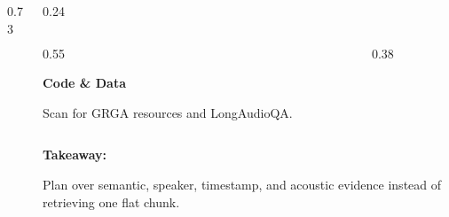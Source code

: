 \documentclass[final]{beamer}
\newlength{\contentWidth}
\newcommand{\smallText}{\fontsize{16.5}{20}\selectfont}
\newenvironment{postercontent}{%
  \par\noindent\hspace*{\dimexpr(\linewidth-\contentWidth)/2\relax}%
  \begin{minipage}{\contentWidth}%
}{%
  \end{minipage}\par
}
\begin{document}
\begin{frame}[t]
\begin{headerbox}
\begin{postercontent}
\begin{columns}[T,totalwidth=\linewidth]
\begin{column}[T]{0.73\linewidth}
\end{column}
\begin{column}[T]{0.24\linewidth}
  \vspace*{0.3cm}
  \begin{tcolorbox}[
    enhanced,
    colback=white,
    colframe=AppleLine,
    boxrule=0.5pt,
    arc=5mm,
    left=14pt,right=14pt,top=12pt,bottom=12pt
  ]
    \begin{columns}[T,totalwidth=\linewidth]
      \begin{column}{0.55\linewidth}
        {\fontsize{22}{27}\selectfont\bfseries\color{AppleBlack}Code \& Data\par}
        \vspace{0.18cm}
        {\smallText\color{AppleGray}Scan for GRGA resources and LongAudioQA.}
      \end{column}
      \begin{column}{0.38\linewidth}
        \centering
      \end{column}
    \end{columns}
  \end{tcolorbox}
  \vspace{0.55cm}
  {\fontsize{22}{27}\selectfont\color{AppleBlack}\bfseries
  Takeaway:\par}
  {\fontsize{21}{27}\selectfont\color{AppleGray}
  Plan over semantic, speaker, timestamp, and acoustic evidence instead of retrieving one flat chunk.}
  \vspace*{0.3cm}
\end{column}
\end{columns}
\end{postercontent}
\end{headerbox}

\vspace{0.5cm}
\begin{postercontent}
\begin{columns}[t,totalwidth=\linewidth]


\end{columns}
\end{postercontent}
\end{frame}
\end{document}
